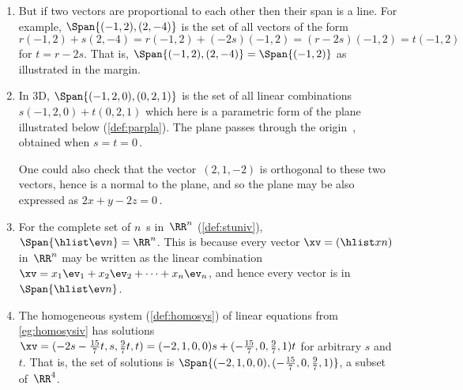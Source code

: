 \begin{example}
\begin{enumerate}
\item But if two vectors are proportional to each other then their span is a line. 
%
For example, \(\Span\{(-1,2),(2,-4)\}\) is the set of all vectors of the form \(r(-1,2)+s(2,-4)=r(-1,2)+(-2s)(-1,2)=(r-2s)(-1,2)=t(-1,2)\) for \(t=r-2s\).  
That is, \(\Span\{(-1,2),(2,-4)\}=\Span\{(-1,2)\}\) as illustrated in the margin.

\item  In 3D, \(\Span\{(-1,2,0),(0,2,1)\}\) is the set of all linear combinations \(s(-1,2,0)+t(0,2,1)\) which here is a parametric form of the plane illustrated below (\autoref{def:parpla}).  
The plane passes through the origin~\ov, obtained when \(s=t=0\)\,.
\begin{center}
 {}
\end{center}
One could also check that the vector~\((2,1,-2)\) is orthogonal to these two vectors, hence is a normal to the plane, and so the plane may be also expressed as \(2x+y-2z=0\)\,.

\item For the complete set of \(n\)~s in~\(\RR^n\) (\autoref{def:stuniv}), \(\Span\{\hlist\ev n\}=\RR^n\).
This is because every vector \(\xv=(\hlist xn)\) in~\(\RR^n\) may be written as the linear combination \(\xv=x_1\ev_1+x_2\ev_2+\cdots+x_n\ev_n\), and hence every vector is in \(\Span\{\hlist\ev n\}\).


\item The homogeneous system (\autoref{def:homosys}) of linear equations from \autoref{eg:homosysiv} has solutions \(\xv=(-2s-\frac{15}7t,s,\frac97t,t) =(-2,1,0,0)s+(-\frac{15}7,0,\frac97,1)t\) for arbitrary \(s\) and~\(t\).
That is, the set of solutions is \(\Span\{(-2,1,0,0),\linebreak[1](-\frac{15}7,0,\frac97,1)\}\), a subset of~\(\RR^4\).


\end{enumerate}
\end{example}
